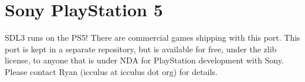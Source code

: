 \chapter{Sony Play\+Station 5 }
\hypertarget{md__mono_runtime_2extern_2sdl_2docs_2_r_e_a_d_m_e-ps5}{}\label{md__mono_runtime_2extern_2sdl_2docs_2_r_e_a_d_m_e-ps5}
\label{md__mono_runtime_2extern_2sdl_2docs_2_r_e_a_d_m_e-ps5_autotoc_md1435}%
%


SDL3 runs on the PS5! There are commercial games shipping with this port. This port is kept in a separate repository, but is available for free, under the zlib license, to anyone that is under NDA for Play\+Station development with Sony. Please contact Ryan (icculus at icculus dot org) for details. 